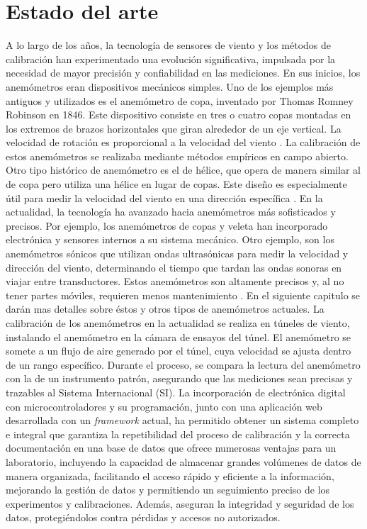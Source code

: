 \section{Estado del arte}\label{sec:estado_del_arte}
A lo largo de los años, la tecnología de sensores de viento y los métodos de calibración han experimentado una evolución significativa, impulsada por la necesidad de mayor precisión y confiabilidad en las mediciones. En sus inicios, los anemómetros eran dispositivos mecánicos simples. Uno de los ejemplos más antiguos y utilizados es el anemómetro de copa, inventado por Thomas Romney Robinson en 1846. Este dispositivo consiste en tres o cuatro copas montadas en los extremos de brazos horizontales que giran alrededor de un eje vertical. La velocidad de rotación es proporcional a la velocidad del viento \cite{robinson1846}. La calibración de estos anemómetros se realizaba mediante métodos empíricos en campo abierto. Otro tipo histórico de anemómetro es el de hélice, que opera de manera similar al de copa pero utiliza una hélice en lugar de copas. Este diseño es especialmente útil para medir la velocidad del viento en una dirección específica \cite{robinson1846}. En la actualidad, la tecnología ha avanzado hacia anemómetros más sofisticados y precisos. Por ejemplo, los anemómetros de copas y veleta han incorporado electrónica y sensores internos a su sistema mecánico. Otro ejemplo, son los anemómetros sónicos que utilizan ondas ultrasónicas para medir la velocidad y dirección del viento, determinando el tiempo que tardan las ondas sonoras en viajar entre transductores. Estos anemómetros son altamente precisos y, al no tener partes móviles, requieren menos mantenimiento \cite{sonic_anemometers}. En el siguiente capitulo se darán mas detalles sobre éstos y otros tipos de anemómetros actuales. La calibración de los anemómetros en la actualidad se realiza en túneles de viento, instalando el anemómetro en la cámara de ensayos del túnel. El anemómetro se somete a un flujo de aire generado por el túnel, cuya velocidad se ajusta dentro de un rango específico. Durante el proceso, se compara la lectura del anemómetro con la de un instrumento patrón, asegurando que las mediciones sean precisas y trazables al Sistema Internacional (SI). La incorporación de electrónica digital con microcontroladores y su programación, junto con una aplicación web desarrollada con un \textit{framework} actual, ha permitido obtener un sistema completo e integral que garantiza la repetibilidad del proceso de calibración y la correcta documentación en una base de datos que ofrece numerosas ventajas para un laboratorio, incluyendo la capacidad de almacenar grandes volúmenes de datos de manera organizada, facilitando el acceso rápido y eficiente a la información, mejorando la gestión de datos y permitiendo un seguimiento preciso de los experimentos y calibraciones. Además, aseguran la integridad y seguridad de los datos, protegiéndolos contra pérdidas y accesos no autorizados.

